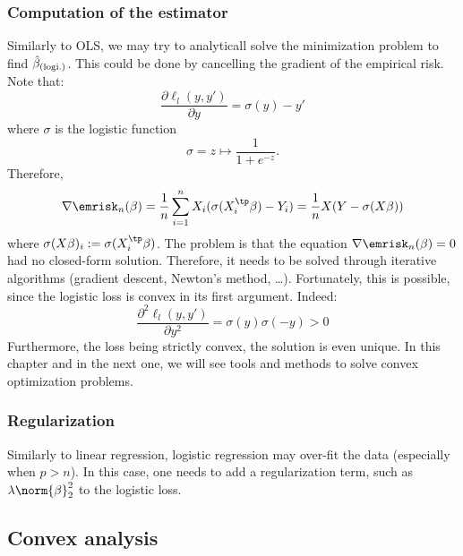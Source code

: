 \documentclass{../cs-classes/cs-classes}
\begin{document}
\subsubsection{Computation of the estimator}
Similarly to OLS, we may try to analyticall solve the minimization problem to find $\hat{\beta}_{(\textnormal{logi.})}$. This could be done by cancelling the gradient of the empirical risk. Note that:
\begin{equation*}
    \frac{\partial\ell_l(y, y')}{\partial y} = \sigma(y)-y'
\end{equation*}
where $\sigma$ is the logistic function
\begin{equation*}
    \sigma = z \longmapsto \frac{1}{1+e^{-z}}.
\end{equation*}
Therefore,
\begin{equation*}
    \nabla\emrisk_n(\beta) = \frac{1}{n}\sum_{i=1}^nX_i(\sigma(X_i^\tp\beta)-Y_i)=\frac{1}{n}X(Y-\sigma(X\beta))
\end{equation*}
where $\sigma(X\beta)_i:=\sigma(X_i^\tp\beta)$. The problem is that the equation $\nabla\emrisk_n(\beta)=0$ had no closed-form solution. Therefore, it needs to be solved through iterative algorithms (gradient descent, Newton's method, \dots). Fortunately, this is possible, since the logistic loss is convex in its first argument. Indeed:
\begin{equation*}
    \frac{\partial^2\ell_l(y, y')}{\partial y^2} = \sigma(y)\sigma(-y)>0
\end{equation*}
Furthermore, the loss being strictly convex, the solution is even unique. In this chapter and in the next one, we will see tools and methods to solve convex optimization problems.

\subsubsection{Regularization}
Similarly to linear regression, logistic regression may over-fit the data (especially when $p>n$). In this case, one needs to add a regularization term, such as $\lambda\norm{\beta}^2_2$ to the logistic loss.

\subsection{Convex analysis}
\end{document}
